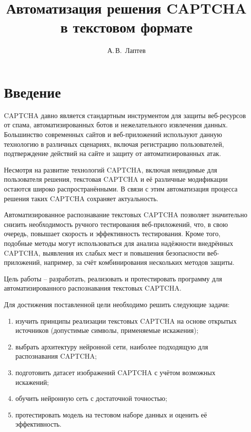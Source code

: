 \documentclass{altsu-report}
\title{Автоматизация решения CAPTCHA в текстовом формате}
\author{А.\,В.~Лаптев}
\institute{Институт цифровых технологий, электроники и физики}
\date{\the\year}
\begin{document}
\maketitle

\setcounter{page}{2}
\makeabstract
\tableofcontents

\chapter*{Введение}

CAPTCHA давно является стандартным инструментом для защиты веб-ресурсов от спама, автоматизированных ботов и нежелательного извлечения данных. Большинство современных сайтов и веб-приложений используют данную технологию в различных сценариях, включая регистрацию пользователей, подтверждение действий на сайте и защиту от автоматизированных атак.

Несмотря на развитие технологий CAPTCHA, включая невидимые для пользователя решения, текстовая CAPTCHA и её различные модификации остаются широко распространёнными. В связи с этим автоматизация процесса решения таких CAPTCHA сохраняет актуальность.

Автоматизированное распознавание текстовых CAPTCHA позволяет значительно снизить необходимость ручного тестирования веб-приложений, что, в свою очередь, повышает скорость и эффективность тестирования. Кроме того, подобные методы могут использоваться для анализа надёжности внедрённых CAPTCHA, выявления их слабых мест и повышения безопасности веб-приложений, например, за счёт комбинирования нескольких методов защиты.

Цель работы -- разработать, реализовать и протестировать программу для автоматизированного распознавания текстовых CAPTCHA.

Для достижения поставленной цели необходимо решить следующие задачи:
\begin{enumerate}
    \item изучить принципы реализации текстовых CAPTCHA на основе открытых источников (допустимые символы, применяемые искажения);
    \item выбрать архитектуру нейронной сети, наиболее подходящую для распознавания CAPTCHA;
    \item подготовить датасет изображений CAPTCHA с учётом возможных искажений;
    \item обучить нейронную сеть с достаточной точностью;
    \item протестировать модель на тестовом наборе данных и оценить её эффективность.
\end{enumerate}
\end{document}
